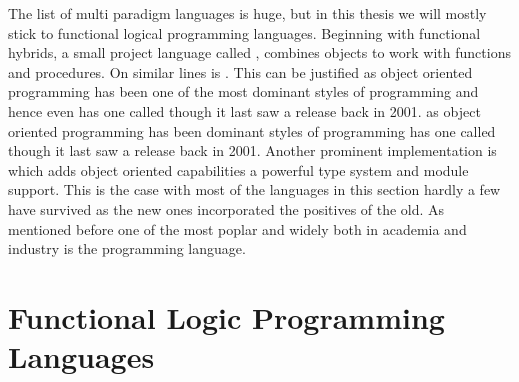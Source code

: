 \documentclass[thesis-solanki.tex]{subfiles}
\begin{document}
The list of multi paradigm languages is huge, but in this thesis we will mostly stick to functional logical
programming languages. Beginning with functional hybrids, a small project language called 
\cite{website:virgil}, combines objects to work with functions and procedures.
On similar lines is  \cite{website:closwiki}.
This can be justified as object oriented programming has been one of the most dominant styles of programming and
hence even  has one called  \cite{website:ohaskell} though it last saw a
release back in 2001.
as object oriented programming has been  dominant styles of programming  has one called 
\cite{website:ohaskell}\yyy{}{\Large,}
though it last saw a release back in 2001.
Another prominent implementation is 
\cite{website:ocamlwiki,website:ocamllang}\yyy{}{\Large,}
which adds object oriented capabilities  a powerful type system and module support.
This is the case with most of the languages in this section hardly a few have survived as the new ones incorporated
the positives of the old.
As mentioned before\yyy{}{\Large,} one of the most poplar \cite{website:langpop} and widely  both in academia and industry is
the  \cite{website:scala} programming language.


\section{Functional Logic Programming Languages}
\end{document}
